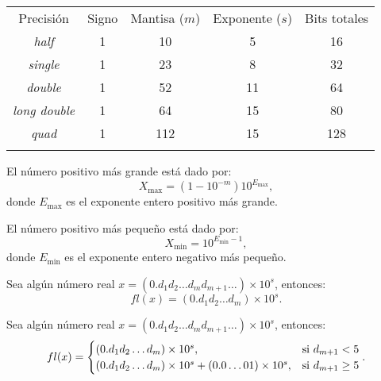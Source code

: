 \documentclass[8pt,a4paper]{extarticle}
\begin{document}
\begin{multicols}{3}
\begin{center}
	\begin{tabular}{| c || c | c | c || c |}
		\hhline{-||---||-}
		Precisión          & Signo & Mantisa ($m$) & Exponente ($s$) & Bits totales \\
		\hhline{=::===::=}
		\emph{half}        & 1 & 10  & 5  & 16  \\
		\emph{single}      & 1 & 23	 & 8  & 32	\\
		\emph{double}      & 1 & 52	 & 11 & 64  \\
		\emph{long double} & 1 & 64	 & 15 & 80  \\
		\emph{quad}        & 1 & 112 & 15 & 128 \\
		\hhline{-||---||-}
	\end{tabular}
\end{center}

\begin{boxprop}[]
	El número positivo más grande está dado por:
	\[
		X_{\max} = \left( 1 - 10^{-m} \right) 10^{E_{\max}}
	,\]
	donde $E_{\max}$ es el exponente entero positivo más grande.
\end{boxprop}

\begin{boxprop}[]
	El número positivo más pequeño está dado por:
	\[
		X_{\min} = 10^{E_{\min} - 1}
	,\] 
	donde $E_{\min}$ es el exponente entero negativo más pequeño.
\end{boxprop}

\sectionbreak

\begin{boxdef}
	Sea algún número real $x = (0.d_1 d_2 \ldots d_m d_{m + 1} \ldots) \times 10^s$, entonces:
	\[
		fl(x)= (0.d_1 d_2 \ldots d_m) \times 10^s
	.\]
\end{boxdef}

\begin{boxdef}
	Sea algún número real $ x = (0.d_1 d_2 \ldots d_m d_{m + 1} \ldots) \times 10^s$, entonces:
	\[
		fl(x) = \begin{cases}
			(0.d_1 d_2 \ldots d_m) \times 10^s, & \text{\normalfont si } d_{m+1} < 5 \\
			(0.d_1 d_2 \ldots d_m) \times 10^s + (0.0 \ldots 01)\times 10^s, & \text{\normalfont si } d_{m+1} \ge 5
		\end{cases}
	.\] 
\end{boxdef}

\vspace{4.5cm}


\end{multicols}
\end{document}
